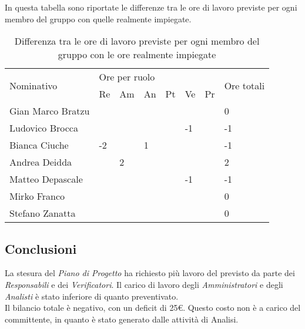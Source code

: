 \begin{flushleft}
    In questa tabella  sono riportate le differenze tra le ore di lavoro previste per ogni membro del gruppo con quelle realmente impiegate.\\
    
    \begin{table}[!h]
    	 \centering
        \begin{tabular}{|l|l|l|l|l|l|l|l|}
        \hline
        \multirow{2}{*}{Nominativo} & \multicolumn{6}{l|}{Ore per ruolo} & \multirow{2}{*}{Ore totali} \\ \cline{2-7}
                                    & Re   & Am  & An  & Pt  & Ve  & Pr  &                             \\ \hline
        Gian Marco Bratzu           &      &     &     &     &     &     & 0                           \\ \hline
        Ludovico Brocca             &      &     &     &     & -1  &     & -1                          \\ \hline
        Bianca Ciuche               & -2   &     & 1   &     &     &     & -1                          \\ \hline
        Andrea Deidda               &      & 2   &     &     &     &     & 2                           \\ \hline
        Matteo Depascale            &      &     &     &     & -1  &     & -1                          \\ \hline
        Mirko Franco                &      &     &     &     &     &     & 0                           \\ \hline
        Stefano Zanatta             &      &     &     &     &     &     & 0                           \\ \hline
        \end{tabular}
         \caption{Differenza tra le ore di lavoro previste per ogni membro del gruppo con le ore realmente impiegate }
        \end{table}
    
    \subsection{Conclusioni}
    La stesura del \textit{Piano di Progetto} ha richiesto più lavoro del previsto da parte dei \textit{Responsabili} e dei \textit{Verificatori}. Il carico di lavoro degli \textit{Amministratori} e degli \textit{Analisti} è stato inferiore di quanto preventivato.\\ Il bilancio totale è negativo, con un deficit di 25\euro. Questo costo non è a carico del committente, in quanto è stato generato dalle attività di Analisi.
    \end{flushleft}